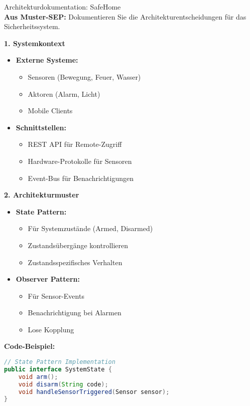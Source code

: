 \begin{example2}{Architekturdokumentation: SafeHome}\\
\textbf{Aus Muster-SEP:} Dokumentieren Sie die Architekturentscheidungen für das Sicherheitssystem.

\textbf{1. Systemkontext}
\begin{itemize}
    \item \textbf{Externe Systeme:}
    \begin{itemize}
        \item Sensoren (Bewegung, Feuer, Wasser)
        \item Aktoren (Alarm, Licht)
        \item Mobile Clients
    \end{itemize}
    
    \item \textbf{Schnittstellen:}
    \begin{itemize}
        \item REST API für Remote-Zugriff
        \item Hardware-Protokolle für Sensoren
        \item Event-Bus für Benachrichtigungen
    \end{itemize}
\end{itemize}

\textbf{2. Architekturmuster}
\begin{itemize}
    \item \textbf{State Pattern:}
    \begin{itemize}
        \item Für Systemzustände (Armed, Disarmed)
        \item Zustandsübergänge kontrollieren
        \item Zustandsspezifisches Verhalten
    \end{itemize}
    
    \item \textbf{Observer Pattern:}
    \begin{itemize}
        \item Für Sensor-Events
        \item Benachrichtigung bei Alarmen
        \item Lose Kopplung
    \end{itemize}
\end{itemize}

\textbf{Code-Beispiel:}
\begin{lstlisting}[language=Java, style=basesmol]
// State Pattern Implementation
public interface SystemState {
    void arm();
    void disarm(String code);
    void handleSensorTriggered(Sensor sensor);
}


\end{lstlisting}
\end{example2}
